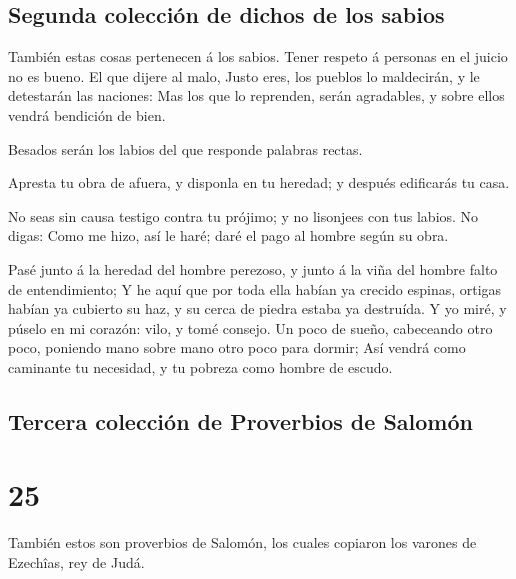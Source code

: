 \hypertarget{segunda-colecciuxf3n-de-dichos-de-los-sabios}{%
\subsection{Segunda colección de dichos de los
sabios}\label{segunda-colecciuxf3n-de-dichos-de-los-sabios}}

 También estas cosas pertenecen á los sabios. Tener respeto
á personas en el juicio no es bueno.  El que dijere al
malo, Justo eres, los pueblos lo maldecirán, y le detestarán las
naciones:  Mas los que lo reprenden, serán agradables, y
sobre ellos vendrá bendición de bien.

 Besados serán los labios del que responde palabras rectas.

 Apresta tu obra de afuera, y disponla en tu heredad; y
después edificarás tu casa.

 No seas sin causa testigo contra tu prójimo; y no
lisonjees con tus labios.  No digas: Como me hizo, así le
haré; daré el pago al hombre según su obra.

 Pasé junto á la heredad del hombre perezoso, y junto á la
viña del hombre falto de entendimiento;  Y he aquí que por
toda ella habían ya crecido espinas, ortigas habían ya cubierto su haz,
y su cerca de piedra estaba ya destruída.  Y yo miré, y
púselo en mi corazón: vilo, y tomé consejo.  Un poco de
sueño, cabeceando otro poco, poniendo mano sobre mano otro poco para
dormir;  Así vendrá como caminante tu necesidad, y tu
pobreza como hombre de escudo.

\hypertarget{tercera-colecciuxf3n-de-proverbios-de-salomuxf3n}{%
\subsection{Tercera colección de Proverbios de
Salomón}\label{tercera-colecciuxf3n-de-proverbios-de-salomuxf3n}}

\hypertarget{section-24}{%
\section{25}\label{section-24}}

 También estos son proverbios de Salomón, los cuales
copiaron los varones de Ezechîas, rey de Judá.

